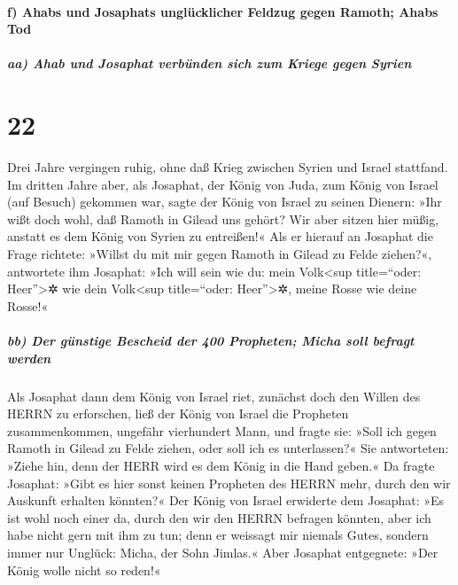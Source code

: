 \hypertarget{f-ahabs-und-josaphats-ungluxfccklicher-feldzug-gegen-ramoth-ahabs-tod}{%
\paragraph{f) Ahabs und Josaphats unglücklicher Feldzug gegen Ramoth;
Ahabs
Tod}\label{f-ahabs-und-josaphats-ungluxfccklicher-feldzug-gegen-ramoth-ahabs-tod}}

\hypertarget{aa-ahab-und-josaphat-verbuxfcnden-sich-zum-kriege-gegen-syrien}{%
\subparagraph{aa) Ahab und Josaphat verbünden sich zum Kriege gegen
Syrien}\label{aa-ahab-und-josaphat-verbuxfcnden-sich-zum-kriege-gegen-syrien}}

\hypertarget{section-21}{%
\section{22}\label{section-21}}

Drei Jahre vergingen ruhig, ohne daß Krieg zwischen Syrien
und Israel stattfand. Im dritten Jahre aber, als Josaphat,
der König von Juda, zum König von Israel (auf Besuch) gekommen war,
sagte der König von Israel zu seinen Dienern: »Ihr wißt
doch wohl, daß Ramoth in Gilead uns gehört? Wir aber sitzen hier müßig,
anstatt es dem König von Syrien zu entreißen!« Als er
hierauf an Josaphat die Frage richtete: »Willst du mit mir gegen Ramoth
in Gilead zu Felde ziehen?«, antwortete ihm Josaphat: »Ich will sein wie
du: mein Volk\textless sup title=``oder: Heer''\textgreater✲ wie dein
Volk\textless sup title=``oder: Heer''\textgreater✲, meine Rosse wie
deine Rosse!«

\hypertarget{bb-der-guxfcnstige-bescheid-der-400-propheten-micha-soll-befragt-werden}{%
\subparagraph{bb) Der günstige Bescheid der 400 Propheten; Micha soll
befragt
werden}\label{bb-der-guxfcnstige-bescheid-der-400-propheten-micha-soll-befragt-werden}}

Als Josaphat dann dem König von Israel riet, zunächst doch
den Willen des HERRN zu erforschen, ließ der König von
Israel die Propheten zusammenkommen, ungefähr vierhundert Mann, und
fragte sie: »Soll ich gegen Ramoth in Gilead zu Felde ziehen, oder soll
ich es unterlassen?« Sie antworteten: »Ziehe hin, denn der HERR wird es
dem König in die Hand geben.« Da fragte Josaphat: »Gibt es
hier sonst keinen Propheten des HERRN mehr, durch den wir Auskunft
erhalten könnten?« Der König von Israel erwiderte dem
Josaphat: »Es ist wohl noch einer da, durch den wir den HERRN befragen
könnten, aber ich habe nicht gern mit ihm zu tun; denn er weissagt mir
niemals Gutes, sondern immer nur Unglück: Micha, der Sohn Jimlas.« Aber
Josaphat entgegnete: »Der König wolle nicht so reden!«

